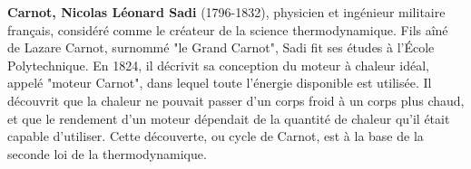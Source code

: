 \textbf{Carnot, Nicolas Léonard Sadi} (1796-1832), physicien et ingénieur militaire français, considéré comme le créateur de la science thermodynamique. Fils aîné de Lazare Carnot, surnommé "le Grand Carnot", Sadi fit ses études à l'École Polytechnique. En 1824, il décrivit sa conception du moteur à chaleur idéal, appelé "moteur Carnot", dans lequel toute l'énergie disponible est utilisée. Il découvrit que la chaleur ne pouvait passer d'un corps froid à un corps plus chaud, et que le rendement d'un moteur dépendait de la quantité de chaleur qu'il était capable d'utiliser. Cette découverte, ou cycle de Carnot, est à la base de la seconde loi de la thermodynamique.\\

